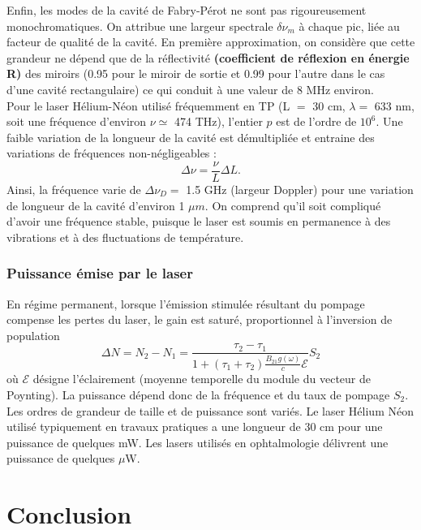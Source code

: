 \documentclass[11pt,a4paper]{report}
\begin{document}
Enfin, les modes de la cavité de Fabry-Pérot ne sont pas rigoureusement monochromatiques. On attribue une largeur spectrale $\delta \nu_m$ à chaque pic, liée au facteur de qualité de la cavité. En première approximation, on considère que cette grandeur ne dépend que de la réflectivité \textbf{(coefficient de réflexion en énergie R)} des miroirs (0.95 pour le miroir de sortie et 0.99 pour l'autre dans le cas d'une cavité rectangulaire) ce qui conduit à une valeur de 8 MHz environ.\\

Pour le laser Hélium-Néon utilisé fréquemment en TP (L $=$ 30 cm, $\lambda = $ 633 nm, soit une fréquence d'environ $\nu \simeq$ 474 THz), l'entier $p$ est de l'ordre de $10^6$. Une faible variation de la longueur de la cavité est démultipliée et entraine des variations de fréquences non-négligeables :
\begin{equation}
	\Delta \nu = \frac{\nu}{L}\Delta L.
\end{equation}
Ainsi, la fréquence varie de $\Delta \nu_D =$ 1.5 GHz (largeur Doppler) pour une variation de longueur de la cavité d'environ 1 $\mu m$. On comprend qu'il soit compliqué d'avoir une fréquence stable, puisque le laser est soumis en permanence à des vibrations et à des fluctuations de température.

\subsubsection*{Puissance émise par le laser}
En régime permanent, lorsque l'émission stimulée résultant du pompage compense les pertes du laser, le gain est saturé, proportionnel à l'inversion de population
\begin{equation}
	\Delta N = N_2 - N_1 = \frac{\tau_2 - \tau_1}
	{1 + \left( \tau_1 + \tau_2 \right) \frac{B_{21}g(\omega)}{c}\mathcal{E}} S_2
\end{equation}
où $\mathcal{E}$ désigne l'éclairement (moyenne temporelle du module du vecteur de Poynting). La puissance dépend donc de la fréquence et du taux de pompage $S_2$.\\

Les ordres de grandeur de taille et de puissance sont variés. Le laser Hélium Néon utilisé typiquement en travaux pratiques a une longueur de 30 cm pour une puissance de quelques mW. Les lasers utilisés en ophtalmologie délivrent une puissance de quelques $\mu$W.

\section*{Conclusion}
\end{document}
